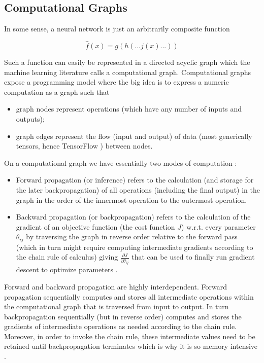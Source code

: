 \subsection{Computational Graphs}

In some sense, a neural network is just an arbitrarily composite function

$$
\hat{f}(x) = g(h( ... j(x) ... ))
$$

Such a function can easily be represented in a directed acyclic graph which the machine learning literature calls a computational graph. Computational graphs expose a programming model where the big idea is to express a numeric computation as a graph such that

\begin{itemize}
    \item graph nodes represent operations (which have any number of inputs and outputs);
    \item graph edges represent the flow (input and output) of data (most generically tensors, hence TensorFlow \cite{tensorflow}) between nodes.
\end{itemize}

On a computational graph we have essentially two modes of computation \cite{deeplearning}:

\begin{itemize}
    \item Forward propagation (or inference) refers to the calculation (and storage for the later backpropagation) of all operations (including the final output) in the graph in the order of the innermost operation to the outermost operation.
    \item Backward propagation (or backpropagation) refers to the calculation of the gradient of an objective function (the cost function $J$) w.r.t. every parameter $\theta_{ij}$ by traversing the graph in reverse order relative to the forward pass (which in turn might require computing intermediate gradients according to the chain rule of calculus) giving $\frac{\partial J}{\partial \theta_{ij}}$ that can be used to finally run gradient descent to optimize parameters \cite{deeplearning}.
\end{itemize}

Forward and backward propagation are highly interdependent. Forward propagation sequentially computes and stores all intermediate operations within the computational graph that is traversed from input to output. In turn backpropagation sequentially (but in reverse order) computes and stores the gradients of intermediate operations as needed according to the chain rule. Moreover, in order to invoke the chain rule, these intermediate values need to be retained until backpropagation terminates which is why it is so memory intensive \cite{deeplearning}.

